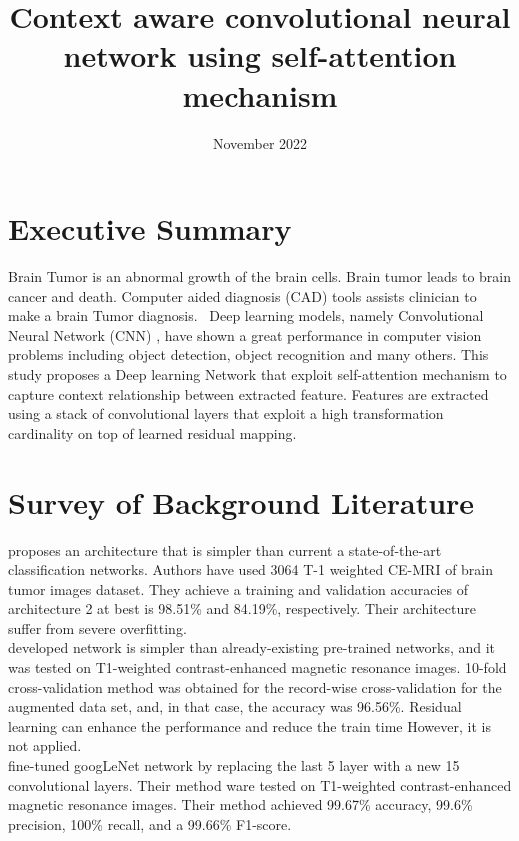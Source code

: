 \documentclass{article}
\title{Context aware convolutional neural network using self-attention mechanism }
\date{November 2022}
\begin{document}
\maketitle


\section{Executive Summary}

Brain Tumor is an abnormal growth of the brain cells\cite{deangelis2001brain}. Brain tumor leads to brain cancer and death\cite{deangelis2001brain}. Computer aided diagnosis (CAD) tools assists clinician to make a brain Tumor diagnosis.
~Deep learning \cite{lecun2015deep} models, namely Convolutional Neural Network (CNN) \cite{lecun1989handwritten}, have shown a great performance in computer vision problems including object detection\cite{erhan2014scalable}\cite{girshick2014rich}\cite{sermanet2013overfeat}\cite{redmon2016you}, object recognition\cite{simonyan2014very}\cite{he2016deep} and many others.
This study proposes a Deep learning Network that exploit self-attention mechanism \cite{vaswani2017attention} to capture context relationship between extracted feature. Features are extracted using a stack of convolutional layers that exploit a high transformation cardinality\cite{xie2017aggregated} on top of learned residual mapping\cite{he2016deep}.


\section{Survey of Background Literature}

\cite{abiwinanda2019brain} proposes an architecture that is simpler than current a state-of-the-art classification networks. Authors have used 3064 T-1 weighted
CE-MRI of brain tumor images dataset\cite{cheng2017brain}. They achieve a training
and validation accuracies of architecture 2 at best is 98.51\% and 84.19\%, respectively. Their architecture suffer from severe overfitting.\\
\cite{badvza2020classification} developed network is simpler than already-existing pre-trained networks, and it was tested on T1-weighted contrast-enhanced magnetic resonance images\cite{cheng2017brain}.  10-fold cross-validation method was obtained for the record-wise cross-validation for the augmented data set, and, in that case, the accuracy was 96.56\%. Residual learning\cite{he2016deep} can enhance the performance and reduce the train time However, it is not applied.\\
\cite{raza2022hybrid} fine-tuned googLeNet\cite{szegedy2015going} network by replacing the last 5 layer with a new 15 convolutional layers. Their method ware tested on T1-weighted contrast-enhanced magnetic resonance images\cite{cheng2017brain}. Their method achieved  99.67\% accuracy, 99.6\% precision, 100\% recall, and a 99.66\% F1-score. 
\end{document}
